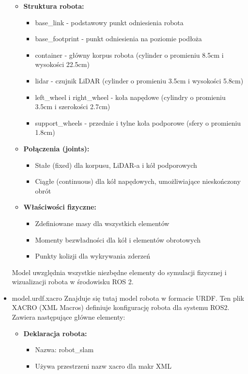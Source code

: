 \documentclass[a4paper,twoside,12pt]{book}
\begin{document}
\begin{itemize}
\begin{itemize}
	\item \textbf{Struktura robota:}
		\begin{itemize}
		\item base\_link - podstawowy punkt odniesienia robota
		\item base\_footprint - punkt odniesienia na poziomie podłoża
		\item container - główny korpus robota (cylinder o promieniu 8.5cm i wysokości 22.5cm)
		\item lidar - czujnik LiDAR (cylinder o promieniu 3.5cm i wysokości 5.8cm)
		\item left\_wheel i right\_wheel - koła napędowe (cylindry o promieniu 3.5cm i szerokości 2.7cm)
		\item support\_wheels - przednie i tylne koła podporowe (sfery o promieniu 1.8cm)
		\end{itemize}

	\item \textbf{Połączenia (joints):}
		\begin{itemize}
		\item Stałe (fixed) dla korpusu, LiDAR-a i kół podporowych
		\item Ciągłe (continuous) dla kół napędowych, umożliwiające nieskończony obrót
		\end{itemize}

	\item \textbf{Właściwości fizyczne:}
		\begin{itemize}
		\item Zdefiniowane masy dla wszystkich elementów
		\item Momenty bezwładności dla kół i elementów obrotowych
		\item Punkty kolizji dla wykrywania zderzeń
		\end{itemize}
	\end{itemize}

	Model uwzględnia wszystkie niezbędne elementy do symulacji fizycznej i wizualizacji robota w środowisku ROS 2.
	\newpage
	\item model.urdf.xacro
	Znajduje się tutaj model robota w formacie URDF.
	Ten plik XACRO (XML Macros) definiuje konfigurację robota dla systemu ROS2. Zawiera następujące główne elementy:

	\begin{itemize}
	\item \textbf{Deklaracja robota:}
		\begin{itemize}
		\item Nazwa: robot\_slam
		\item Używa przestrzeni nazw xacro dla makr XML
		\end{itemize}


\end{itemize}
\end{itemize}
\end{document}
